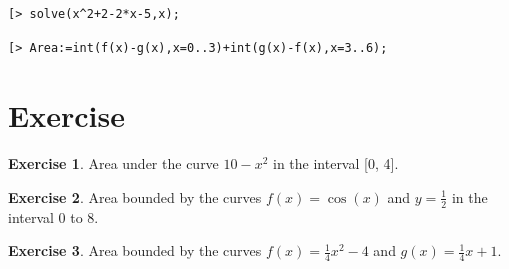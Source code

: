 \documentclass[
]{book}
\theoremstyle{definition}
\theoremstyle{definition}
\theoremstyle{definition}
\newtheorem{exercise}{Exercise}[chapter]
\theoremstyle{definition}
\theoremstyle{remark}
\begin{document}
\begin{verbatim}
[> solve(x^2+2-2*x-5,x);
\end{verbatim}

\begin{verbatim}
[> Area:=int(f(x)-g(x),x=0..3)+int(g(x)-f(x),x=3..6);
\end{verbatim}

\section{Exercise}\label{exercise-3}

\begin{exercise}
\protect\hypertarget{exr:unnamed-chunk-20}{}\label{exr:unnamed-chunk-20}Area under the curve \(10 - x^2\) in the interval {[}0, 4{]}.
\end{exercise}

\begin{exercise}
\protect\hypertarget{exr:unnamed-chunk-21}{}\label{exr:unnamed-chunk-21}Area bounded by the curves \(f(x) = \cos(x)\) and \(y = \frac{1}{2}\) in the interval 0 to 8.
\end{exercise}

\begin{exercise}
\protect\hypertarget{exr:unnamed-chunk-22}{}\label{exr:unnamed-chunk-22}Area bounded by the curves \(f(x) = \frac{1}{4}x^2 - 4\) and \(g(x) = \frac{1}{4}x + 1\).
\end{exercise}

  
\end{document}
